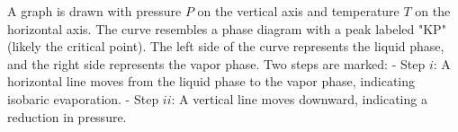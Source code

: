 A graph is drawn with pressure \( P \) on the vertical axis and temperature \( T \) on the horizontal axis. The curve resembles a phase diagram with a peak labeled "KP" (likely the critical point). The left side of the curve represents the liquid phase, and the right side represents the vapor phase. Two steps are marked:  
- Step \( i \): A horizontal line moves from the liquid phase to the vapor phase, indicating isobaric evaporation.  
- Step \( ii \): A vertical line moves downward, indicating a reduction in pressure.